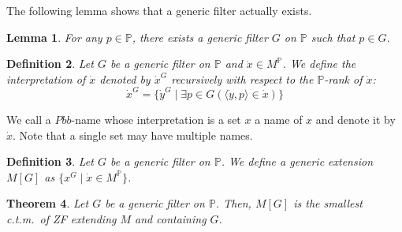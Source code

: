 \documentclass{report}
\newtheorem{thm}{Theorem}[section]
\newtheorem{lem}[thm]{Lemma}
\newtheorem{dfn}[thm]{Definition}
\newcommand{\Pbb}{\mathbb{P}}
\newcommand{\ctm}{c.t.m.\ }
\begin{document}
The following lemma shows that a generic filter actually exists.
\begin{lem} 
  For any $p \in \Pbb$, there exists a generic filter $G$ on $\Pbb$ such that $p \in G$.
\end{lem}

\begin{dfn} 
  Let $G$ be a generic filter on $\Pbb$ and $\dot{x} \in M^{\Pbb}$. We define the \emph{interpretation} of $\dot{x}$ denoted by $\dot{x}^G$ recursively with respect to the $\Pbb$-rank of $\dot{x}$:
  $$\dot{x}^G = \{\dot{y}^G \mid \exists p \in G (\langle \dot{y}, p \rangle \in \dot{x})\}$$ 
\end{dfn}

We call a $Pbb$-name whose interpretation is a set $x$ a name of $x$ and denote it by $\dot{x}$.
Note that a single set may have multiple names.

\begin{dfn} 
  Let $G$ be a generic filter on $\Pbb$. We define a \emph{generic extension} $M[G]$ as $\{x^G \mid \dot{x} \in M^{\Pbb}\}$.
\end{dfn}

\begin{thm} 
  Let $G$ be a generic filter on $\Pbb$. Then, $M[G]$ is the smallest \ctm of ZF extending $M$ and containing $G$.
\end{thm}
\end{document}
